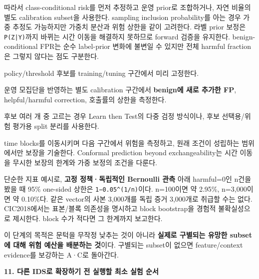 따라서 class-conditional risk를 먼저 추정하고 운영 prior로 조합하거나, 자연 비율의 별도 calibration subset을 사용한다. sampling inclusion probability를 아는 경우 가중 추정도 가능하지만 가중치 분산과 위험 상한을 같이 고려한다. 라벨 prior 보정은 \texttt{P(Z|Y)}까지 바뀌는 시간 이동을 해결하지 못하므로 forward 검증을 유지한다. benign-conditional FPR는 순수 label-prior 변화에 불변일 수 있지만 전체 harmful fraction은 그렇지 않다는 점도 구분한다.

\par\noindent \textbullet\enspace policy/\allowbreak{}threshold 후보를 training/\allowbreak{}tuning 구간에서 미리 고정한다.


\par\noindent \textbullet\enspace 운영 모집단을 반영하는 별도 calibration 구간에서 \textbf{benign에 새로 추가한 FP}, helpful/\allowbreak{}harmful correction, 호출률의 상한을 측정한다.


\par\noindent \textbullet\enspace 후보 여러 개 중 고르는 경우 Learn then Test의 다중 검정 방식이나, 후보 선택용/\allowbreak{}위험 평가용 split 분리를 사용한다.


\par\noindent \textbullet\enspace time blocks를 이동시키며 다음 구간에서 위험을 측정하고, 원래 조건이 성립하는 범위에서만 보장을 기술한다. Conformal prediction beyond exchangeability는 시간 이동을 무시한 보장의 한계와 가중 보정의 조건을 다룬다.


단순한 지표 예시로, \textbf{고정 정책·독립적인 Bernoulli 관측} 아래 harmful=\allowbreak{}0인 n건을 봤을 때 95\% one-sided 상한은 \texttt{1−0.\allowbreak{}05\textasciicircum{}(\allowbreak{}1/\allowbreak{}\allowbreak{}n)}이다. n=\allowbreak{}100이면 약 2.95\%, n=\allowbreak{}3,000이면 약 0.10\%다. 같은 vector의 사본 3,000개를 독립 증거 3,000개로 취급할 수는 없다. CIC2018에서는 표본/\allowbreak{}블록 의존성을 명시하고 block bootstrap을 경험적 불확실성으로 제시한다. block 수가 적다면 그 한계까지 보고한다.

이 단계의 목적은 문턱을 무작정 낮추는 것이 아니라 \textbf{실제로 구별되는 유망한 subset에 대해 위험 예산을 배분하는 것}이다. 구별되는 subset이 없으면 feature/\allowbreak{}context evidence를 보강하는 A·C로 돌아간다.

\textbf{11. 다른 IDS로 확장하기 전 실행할 최소 실험 순서}

